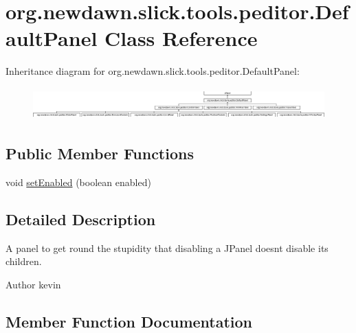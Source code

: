 \hypertarget{classorg_1_1newdawn_1_1slick_1_1tools_1_1peditor_1_1_default_panel}{}\section{org.\+newdawn.\+slick.\+tools.\+peditor.\+Default\+Panel Class Reference}
\label{classorg_1_1newdawn_1_1slick_1_1tools_1_1peditor_1_1_default_panel}
Inheritance diagram for org.\+newdawn.\+slick.\+tools.\+peditor.\+Default\+Panel\+:\begin{figure}[H]
\begin{center}
\leavevmode
\includegraphics[height=1.252796cm]{classorg_1_1newdawn_1_1slick_1_1tools_1_1peditor_1_1_default_panel}
\end{center}
\end{figure}
\subsection*{Public Member Functions}
\begin{DoxyCompactItemize}
\item 
void \mbox{\hyperlink{classorg_1_1newdawn_1_1slick_1_1tools_1_1peditor_1_1_default_panel_ae7d7b9c33e70e3725f76d561955aac38}{set\+Enabled}} (boolean enabled)
\end{DoxyCompactItemize}


\subsection{Detailed Description}
A panel to get round the stupidity that disabling a J\+Panel doesn\textquotesingle{}t disable it\textquotesingle{}s children.

\begin{DoxyAuthor}{Author}
kevin 
\end{DoxyAuthor}


\subsection{Member Function Documentation}
\mbox{\label{classorg_1_1newdawn_1_1slick_1_1tools_1_1peditor_1_1_default_panel_ae7d7b9c33e70e3725f76d561955aac38}} 
